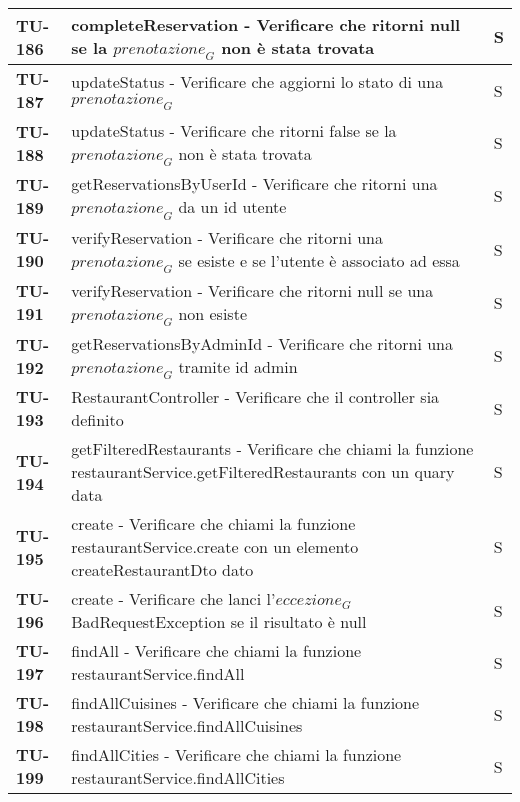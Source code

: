 \begin{longtable}{|>{\centering\arraybackslash}p{2cm}|p{15cm}|p{1cm}|}
  \textbf{TU-186} & completeReservation - Verificare che ritorni null se la $\textit{prenotazione}_G$ non è stata trovata & S \\ 
  \hline
  \rowcolor{gray!10}
  \textbf{TU-187} & updateStatus - Verificare che aggiorni lo stato di una $\textit{prenotazione}_G$ & S \\ 
  \hline
  \rowcolor{gray!10}
  \textbf{TU-188} & updateStatus - Verificare che ritorni false se la $\textit{prenotazione}_G$ non è stata trovata & S \\ 
  \hline
  \rowcolor{gray!10}
  \textbf{TU-189} & getReservationsByUserId - Verificare che ritorni una $\textit{prenotazione}_G$ da un id utente & S \\ 
  \hline
  \rowcolor{gray!10}
  \textbf{TU-190} & verifyReservation - Verificare che ritorni una $\textit{prenotazione}_G$ se esiste e se l'utente è associato ad essa & S \\ 
  \hline
  \rowcolor{gray!10}
  \textbf{TU-191} & verifyReservation - Verificare che ritorni null se una $\textit{prenotazione}_G$ non esiste & S \\ 
  \hline
  \rowcolor{gray!10}
  \textbf{TU-192} & getReservationsByAdminId - Verificare che ritorni una $\textit{prenotazione}_G$ tramite id admin & S \\ 
  \hline
  \rowcolor{gray!10}
  \textbf{TU-193} & RestaurantController - Verificare che il controller sia definito & S \\ 
  \hline
  \rowcolor{gray!10}
  \textbf{TU-194} & getFilteredRestaurants - Verificare che chiami la funzione restaurantService.getFilteredRestaurants con un quary data & S \\ 
  \hline
  \rowcolor{gray!10}
  \textbf{TU-195} & create - Verificare che chiami la funzione restaurantService.create con un elemento createRestaurantDto dato & S \\ 
  \hline
  \rowcolor{gray!10}
  \textbf{TU-196} & create - Verificare che lanci l'$\textit{eccezione}_G$ BadRequestException se il risultato è null & S \\ 
  \hline
  \rowcolor{gray!10}
  \textbf{TU-197} & findAll - Verificare che chiami la funzione restaurantService.findAll & S \\ 
  \hline
  \rowcolor{gray!10}
  \textbf{TU-198} & findAllCuisines - Verificare che chiami la funzione restaurantService.findAllCuisines & S \\ 
  \hline
  \rowcolor{gray!10}
  \textbf{TU-199} & findAllCities - Verificare che chiami la funzione restaurantService.findAllCities & S \\ 

\end{longtable}
